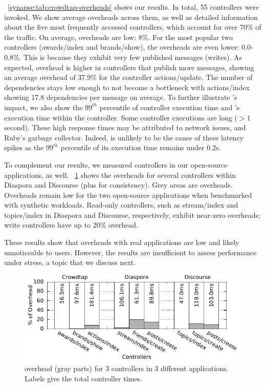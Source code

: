 \F~\ref{synapse:tab:crowdtap-overheads} shows our results. In total, 55 controllers
were invoked. We show average overheads across them, as well as detailed
information about the five most frequently accessed controllers, which account
for over 70\% of the traffic. On average, \synapse overheads are low: 8\%.
For the most popular two controllers ({\code awards/index} and {\code
brands/show}), the overheads are even lower: 0.0-0.8\%. This is because they
exhibit very few published messages (writes). As expected, \synapse overhead
is higher in controllers that publish more messages, showing an average overhead
of 37.9\% for the controller {\code actions/update}.
The number of dependencies stays low enough to not become a bottleneck with
{\code actions/index} showing 17.8 dependencies per message on average.
To further illustrate \synapse's impact, we also show the $99^{th}$ percentile
of controller execution time and \synapse's execution time within the controller.
Some controller executions are long ($>1$ second). These high response times may
be attributed to network issues, and Ruby's garbage collector.
Indeed, \synapse is unlikely to be the cause of these latency spikes as the
$99^{th}$ percentile of its execution time remains under $0.2$s.

To complement our \crowdtap results, we measured controllers in our open-source
applications, as well. \F~\ref{synapse:fig:app-overheads} shows the \synapse
overheads for several controllers within Diaspora and Discourse (plus
\crowdtap for consistency). Grey areas are \synapse overheads. Overheads
remain low for the two open-source applications when benchmarked with synthetic
workloads. Read-only controllers, such as {\code stream/index} and {\code
topics/index} in Diaspora and Discourse, respectively, exhibit near-zero
overheads; write controllers have up to 20\% overhead.

These results show that \synapse overheads with real applications are low and
likely unnoticeable to users. However, the results are insufficient to assess
performance under stress, a topic that we discuss next.

\begin{figure}[t]
 \centering
 \includegraphics[width=0.8\linewidth]{figures/synapse/overhead-hist.pdf}
 \caption{\synapse overhead (gray parts) for 3 controllers in 3 different
 applications. Labels give the total controller times.}
 \label{synapse:fig:app-overheads}
\end{figure}



